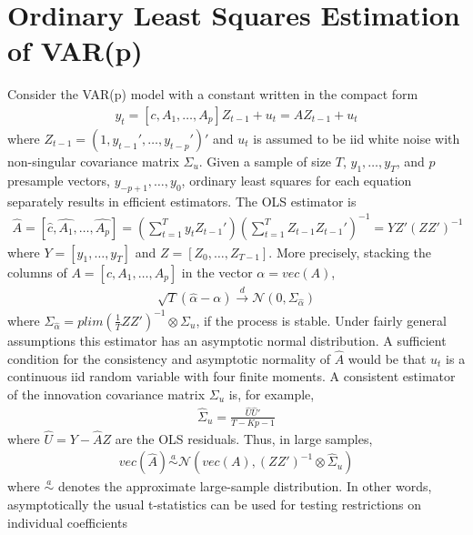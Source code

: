 \section[Ordinary Least Squares Estimation of VAR(p)]{Ordinary Least Squares Estimation of VAR(p)\label{ex:OrdinaryLeastSquaresEstimationVARp}}
Consider the VAR(p) model with a constant written in the compact form
\begin{align*}
y_t = [c, A_1, \ldots, A_p] Z_{t-1} + u_t = A Z_{t-1}+ u_t
\end{align*}
where \(Z_{t-1}=(1,y_{t-1}',\ldots,y_{t-p}')'\)
and \(u_t\) is assumed to be iid white noise with non-singular covariance matrix \(\Sigma_u\).
Given a sample of size \(T\), \(y_1, \ldots, y_T\), and \(p\) presample vectors, \(y_{-p+1},\ldots,y_{0}\),
  ordinary least squares for each equation separately results in efficient estimators.
The OLS estimator is
\begin{align*}
\hat{A} = \left[ \hat{c}, \hat{A_1}, \ldots ,\hat{A_p}\right] = \left(\sum_{t=1}^{T}y_t Z_{t-1}'\right)\left(\sum_{t=1}^{T}Z_{t-1}Z_{t-1}'\right)^{-1} = Y Z'{(ZZ')}^{-1}
\end{align*}
where \(Y=[y_1, \ldots, y_T]\) and \(Z=[Z_0, \ldots, Z_{T-1}]\).
More precisely, stacking the columns of \(A = [c, A_1,\ldots ,A_p]\) in the vector \(\alpha = vec(A)\),
\begin{align*}
\sqrt{T}\left(\hat{\alpha} - \alpha \right) \overset{d}{\rightarrow} \mathcal{N}(0, \Sigma_{\hat{\alpha}})
\end{align*}
where \(\Sigma_{\hat{\alpha}} = plim(\frac{1}{T}ZZ')^{-1}\otimes \Sigma_u\), if the process is stable.
Under fairly general assumptions this estimator has an asymptotic normal distribution.
A sufficient condition for the consistency and asymptotic normality of \(\hat{A}\) would be
  that \(u_t\) is a continuous iid random variable with four finite moments.
A consistent estimator of the innovation covariance matrix \(\Sigma_u\) is, for example,
\begin{align*}
\hat{\Sigma}_u = \frac{\hat{U}\hat{U}'}{T-Kp-1}
\end{align*}
where \(\hat{U} = Y - \hat{A}Z\) are the OLS residuals.
Thus, in large samples,
\begin{align*}
vec(\hat{A}) \overset{a}{\sim}\mathcal{N}(vec(A),{(ZZ')}^{-1}\otimes \hat{\Sigma}_u)
\end{align*}
where \(\overset{a}{\sim}\) denotes the approximate large-sample distribution.
In other words, asymptotically the usual t-statistics can be used for testing restrictions on individual coefficients
